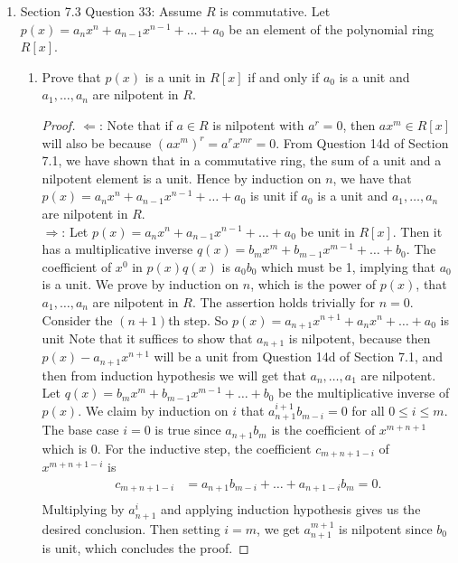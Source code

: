 \documentclass{article}
\begin{document}
\begin{enumerate}[label={\bf Q\arabic*:}]
  \item Section 7.3 Question 33: Assume $R$ is commutative. Let
    $p(x)=a_nx^n+a_{n-1}x^{n-1}+\ldots+a_0$ be an element of the polynomial
    ring $R[x]$.

    \begin{enumerate}
      \item Prove that $p(x)$ is a unit in $R[x]$ if and only if $a_0$ is a
        unit and $a_1,\ldots,a_n$ are nilpotent in $R$.
        \begin{proof}
          $\Leftarrow$: Note that if $a\in R$ is nilpotent with $a^r=0$,
          then $ax^m\in R[x]$ will also be because $(ax^m)^r=a^rx^{mr}=0$.
          From Question 14d of Section 7.1, we have shown that in a
          commutative ring, the sum of a unit and a nilpotent element is a
          unit. Hence by induction on $n$, we have that
          $p(x)=a_nx^n+a_{n-1}x^{n-1}+\ldots+a_0$ is unit if $a_0$ is a
          unit and $a_1,\ldots,a_n$ are nilpotent in $R$. \\

          $\Rightarrow$: Let $p(x)=a_nx^n+a_{n-1}x^{n-1}+\ldots+a_0$ be
          unit in $R[x]$. Then it has a multiplicative inverse
          $q(x)=b_mx^m+b_{m-1}x^{m-1}+\ldots+b_0$. The coefficient of $x^0$
          in $p(x)q(x)$ is $a_0b_0$ which must be 1, implying that $a_0$ is
          a unit. We prove by induction on $n$, which is the power of
          $p(x)$, that $a_1,\ldots,a_n$ are nilpotent in $R$. The assertion
          holds trivially for $n=0$. Consider the $(n+1)$th step. So
          $p(x)=a_{n+1}x^{n+1}+a_{n}x^{n}+\ldots+a_0$ is unit Note that it
          suffices to show that $a_{n+1}$ is nilpotent, because then
          $p(x)-a_{n+1}x^{n+1}$ will be a unit from Question 14d of Section
          7.1, and then from induction hypothesis we will get that
          $a_n,\ldots,a_1$ are nilpotent. Let
          $q(x)=b_mx^m+b_{m-1}x^{m-1}+\ldots+b_0$ be the multiplicative
          inverse of $p(x)$. We claim by induction on $i$ that
          $a_{n+1}^{i+1}b_{m-i}=0$ for all $0\leq i\leq m$. The base case
          $i=0$ is true since $a_{n+1}b_{m}$ is the coefficient of
          $x^{m+n+1}$ which is 0. For the inductive step, the coefficient
          $c_{m+n+1-i}$ of $x^{m+n+1-i}$ is
          \begin{align*}
            c_{m+n+1-i} &= a_{n+1}b_{m-i}+\ldots+a_{n+1-i}b_{m} = 0. \\
          \end{align*}
          Multiplying by $a_{n+1}^i$ and applying induction hypothesis
          gives us the desired conclusion. Then setting $i=m$, we get
          $a_{n+1}^{m+1}$ is nilpotent since $b_0$ is unit, which concludes
          the proof.
        \end{proof}


\end{enumerate}
\end{enumerate}
\end{document}

